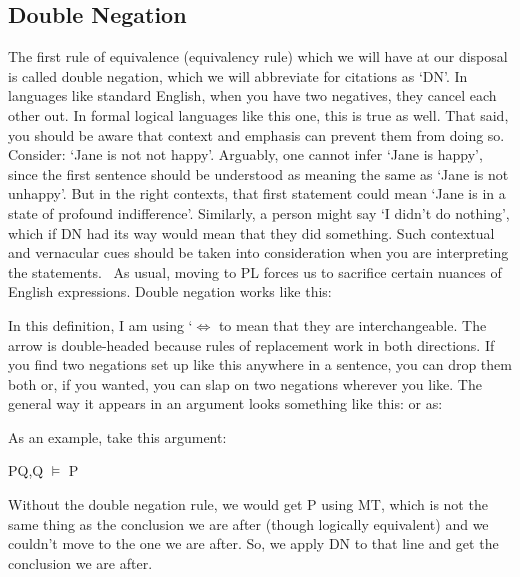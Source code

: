 \subsection{Double Negation}
The first rule of equivalence (equivalency rule) which we will have at our disposal is called double negation, which we will abbreviate for citations as `DN'. In languages like standard English, when you have two negatives, they cancel each other out. In formal logical languages like this one, this is true as well. That said, you should be aware that context and emphasis can prevent them from doing so. Consider: `Jane is not not happy'. Arguably, one cannot infer `Jane is happy', since the first sentence should be understood as meaning the same as `Jane is not unhappy'. But in the right contexts, that first statement could mean `Jane is in a state of profound indifference'. Similarly, a person might say `I didn't do nothing', which if DN had its way would mean that they did something. Such contextual and vernacular cues should be taken into consideration when you are interpreting the statements.  As usual, moving to PL forces us to sacrifice certain nuances of English expressions. Double negation works like this:


In this definition, I am using `$\Leftrightarrow$ to mean that they are interchangeable. The arrow is double-headed because rules of replacement work in both directions. If you find two negations set up like this anywhere in a sentence, you can drop them both or, if you wanted, you can slap on two negations wherever you like. The general way it appears in an argument looks something like this:
or as:

As an example, take this argument:
\begin{center}
\enot P\eif Q,\enot Q $\vDash$ P
\end{center}
Without the double negation rule, we would get \enot \enot P using MT, which is not the same thing as the conclusion we are after (though logically equivalent) and we couldn't move to the one we are after. So, we apply DN to that line and get the conclusion we are after.
\begin{fitchproof}
 
 
\end{fitchproof}

